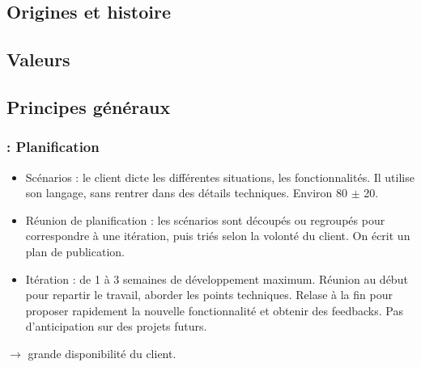 \begin{frame}
\tableofcontents

\end{frame}
    
\subsection{Origines et histoire}
\begin{frame}
\frametitle{\insertsubsection}
\end{frame}

\subsection{Valeurs}
\begin{frame}
\frametitle{\insertsubsection}
\end{frame}

\subsection{Principes généraux}
\begin{frame}
\frametitle{\insertsubsection : Planification}
\begin{itemize}
\item Scénarios : le client dicte les différentes situations, les fonctionnalités. Il utilise son langage, sans rentrer dans des détails techniques. Environ 80 $\pm$ 20.
\item Réunion de planification : les scénarios sont découpés ou regroupés pour correspondre à une itération, puis triés selon la volonté du client. On écrit un plan de publication.
\item Itération : de 1 à 3 semaines de développement maximum. Réunion au début pour repartir le travail, aborder les points techniques. Relase à la fin pour proposer rapidement la nouvelle fonctionnalité et obtenir des feedbacks. Pas d'anticipation sur des projets futurs.
\end{itemize}
\begin{center}
$\longrightarrow$ grande disponibilité du client.
\end{center}
\end{frame}

